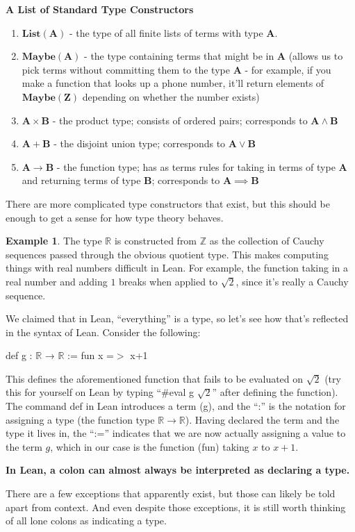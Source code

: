 \documentclass{article}
\theoremstyle{definition}
\newtheorem{example}[theorem]{Example}
\newcommand{\R}{\mathbb{R}}
\newcommand{\Z}{\mathbb{Z}}
\newcommand{\1}{\mathbb{1}}
\newcommand{\0}{\mathbb{0}}
\newcommand{\ty}{\mathbf}
\begin{document}
\noindent\textbf{A List of Standard Type Constructors}
\begin{enumerate}
    \item $\ty{List}(\ty A)$ - the type of all finite lists of terms with type $\ty A$. 
    \item $\ty{Maybe}(\ty A)$ - the type containing terms that might be in $\ty A$ (allows us to pick terms without committing them to the type $\ty A$ - for example, if you make a function that looks up a phone number, it'll return elements of $\ty{Maybe}(\ty Z)$ depending on whether the number exists)
    \item $\ty A \times \ty B$ - the product type; consists of ordered pairs; corresponds to $\ty A \wedge \ty B$
    \item $\ty A + \ty B$ - the disjoint union type; corresponds to $\ty A \vee \ty B$
    \item $\ty A \to \ty B$ - the function type; has as terms rules for taking in terms of type $\ty A$ and returning terms of type $\ty B$; corresponds to $\ty A \implies \ty B$
\end{enumerate}

There are more complicated type constructors that exist, but this should be enough to get a sense for how type theory behaves. 

\begin{example}
The type $\R$ is constructed from $\Z$ as the collection of Cauchy sequences passed through the obvious quotient type. This makes computing things with real numbers difficult in Lean. For example, the function taking in a real number and adding $1$ breaks when applied to $\sqrt{2}$, since it's really a Cauchy sequence. 
\end{example}

We claimed that in Lean, \enquote{everything} is a type, so let's see how that's reflected in the syntax of Lean. Consider the following:
\begin{center}
    def g : $\R$ → $\R$ := fun x =$>$ x+1
\end{center}
This defines the aforementioned function that fails to be evaluated on $\sqrt{2}$ (try this for yourself on Lean by typing \enquote{$\#$eval g $\sqrt 2$} after defining the function). The command def in Lean introduces a term (g), and the \enquote{:} is the notation for assigning a type (the function type $\R \to \R$). Having declared the term and the type it lives in, the \enquote{:=} indicates that we are now actually assigning a value to the term $g$, which in our case is the function (fun) taking $x$ to $x + 1$. 
\begin{center}
    \textbf{In Lean, a colon can almost always be interpreted as declaring a type.}
\end{center}
There are a few exceptions that apparently exist, but those can likely be told apart from context. And even despite those exceptions, it is still worth thinking of all lone colons as indicating a type. 
\end{document}

